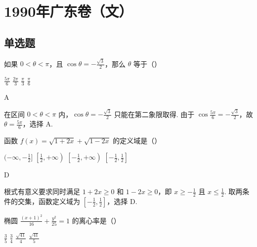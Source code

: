 \documentclass[UTF8,a4paper,oneside,11pt]{ctexbook}
\begin{document}
\mainmatter

\chapter{1990年广东卷（文）}

\section{单选题}

\begin{problem}
如果 \(0<\theta<\pi\)，且 \(\cos\theta=-\frac{\sqrt{3}}{2}\)，那么 \(\theta\) 等于（\quad）

\choices
    {\(\frac{5\pi}{6}\)}
    {\(\frac{2\pi}{3}\)}
    {\(\frac{\pi}{3}\)}
    {\(\frac{\pi}{6}\)}
\end{problem}

\begin{answer}
A
\end{answer}

\begin{solution}
在区间 \(0<\theta<\pi\) 内，\(\cos\theta=-\frac{\sqrt{3}}{2}\) 只能在第二象限取得. 由于 \(\cos\frac{5\pi}{6}=-\frac{\sqrt{3}}{2}\)，故 \(\theta=\frac{5\pi}{6}\)，选择 A.
\end{solution}

\begin{problem}
函数 \(f(x)=\sqrt{1+2x}+\sqrt{1-2x}\) 的定义域是（\quad）

\choices
    {\((-\infty,-\frac{1}{2}]\)}
    {\(\left[\frac{1}{2},+\infty\right)\)}
    {\(\left[-\frac{1}{2},+\infty\right)\)}
    {\(\left[-\frac{1}{2},\frac{1}{2}\right]\)}
\end{problem}

\begin{answer}
D
\end{answer}

\begin{solution}
根式有意义要求同时满足 \(1+2x\geqslant0\) 和 \(1-2x\geqslant0\)，即 \(x\geqslant-\frac{1}{2}\) 且 \(x\leqslant\frac{1}{2}\). 取两条件的交集，函数定义域为 \(\left[-\frac{1}{2},\frac{1}{2}\right]\)，选择 D.
\end{solution}

\begin{problem}
椭圆 \(\frac{(x+1)^2}{16}+\frac{y^2}{25}=1\) 的离心率是（\quad）

\choices
    {\(\frac{3}{5}\)}
    {\(\frac{3}{4}\)}
    {\(\frac{\sqrt{41}}{4}\)}
    {\(\frac{\sqrt{41}}{5}\)}
\end{problem}
\end{document}
